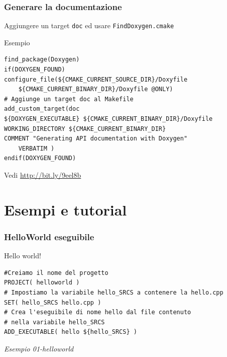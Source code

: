 \documentclass[10pt] {beamer}
\begin{document}

\begin{frame}[fragile]
 \frametitle{Generare la documentazione}
Aggiungere un target \texttt{doc} ed usare \texttt{FindDoxygen.cmake}
\begin{block}{Esempio}
\begin{small}
\begin{verbatim}
find_package(Doxygen)
if(DOXYGEN_FOUND)
configure_file(${CMAKE_CURRENT_SOURCE_DIR}/Doxyfile 
    ${CMAKE_CURRENT_BINARY_DIR}/Doxyfile @ONLY)
# Aggiunge un target doc al Makefile 
add_custom_target(doc
${DOXYGEN_EXECUTABLE} ${CMAKE_CURRENT_BINARY_DIR}/Doxyfile
WORKING_DIRECTORY ${CMAKE_CURRENT_BINARY_DIR}
COMMENT "Generating API documentation with Doxygen" 
    VERBATIM )
endif(DOXYGEN_FOUND)
\end{verbatim}
\end{small}
\end{block}
Vedi \url{http://bit.ly/9eel8b}
\end{frame}

\section{Esempi e tutorial}

\begin{frame}[fragile]
\frametitle{HelloWorld eseguibile}

\begin{block}{Hello world!}
\begin{small}
\begin{verbatim}
#Creiamo il nome del progetto
PROJECT( helloworld )
# Impostiamo la variabile hello_SRCS a contenere la hello.cpp
SET( hello_SRCS hello.cpp )
# Crea l'eseguibile di nome hello dal file contenuto 
# nella variabile hello_SRCS
ADD_EXECUTABLE( hello ${hello_SRCS} )
\end{verbatim}
\end{small}
\end{block}

\emph{Esempio 01-helloworld}
\end{frame}
\end{document}
